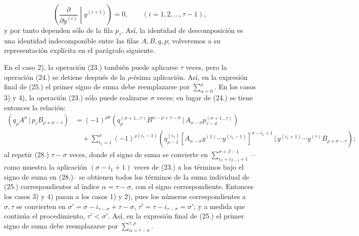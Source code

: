 \documentclass[11pt]{article}
\newcommand{\pair}[2]{(#1\,|\,#2)}
\begin{document}
\begin{equation}
 \left(\frac{\partial}{\partial y^{(i)}}\middle|y^{(i+1)}\right)=0,
 \qquad (i=1,2,\ldots,\tau-1),
\tag{27}
\end{equation}
y por tanto dependen sólo de la fila $p_\tau$. Así, la identidad de descomposición es una identidad indecomponible entre las filas $A,B,q,p$; volveremos a su representación explícita en el parágrafo siguiente.

En el caso 2), la operación (23.) también puede aplicarse $\tau$ veces, pero la operación (24.) se detiene después de la $\rho$-ésima aplicación. Así, en la expresión final de (25.) el primer signo de suma debe reemplazarse por $\sum_{\alpha=0}^{\rho}$. En los casos 3) y 4), la operación (23.) sólo puede realizarse $\sigma$ veces; en lugar de (24.) se tiene entonces la relación:
\begin{equation}
\begin{aligned}
\pair{q_\rho A^\sigma}{p_\tau B_{\rho+\sigma-\tau}}
&=(-1)^{\rho\sigma}
 \pair{q_\rho^{(\sigma+1\ldots\tau)}B^{n-\rho+\tau-\sigma}}{A_{n-\sigma}p_{\tau-\sigma}^{(\sigma+1\ldots\tau)}}\\
&\quad+\sum_{i_1=1}^{\sigma}(-1)^{\rho(i_1-1)}
 \pair{q_{\rho-1}^{(i_1)}[A_{n-\sigma}y^{(1)}\cdots y^{(i_1-1)}]^{\sigma-i_1+1}}
 {y^{(i_1+1)}\cdots y^{(\tau)}B_{\rho+\sigma-\tau}};
\end{aligned}
\tag{28}
\end{equation}
al repetir (28.) $\tau-\sigma$ veces, donde el signo de suma se convierte en $\sum_{i_\beta=i_{\beta-1}+1}^{\sigma+\beta-1}$ --como muestra la aplicación $(\sigma-i_1+1)$ veces de (23.) a los términos bajo el signo de suma en (28.)-- se obtienen todos los términos de la suma individual de (25.) correspondientes al índice $\alpha=\tau-\sigma$, con el signo correspondiente. Entonces los casos 3) y 4) pasan a los casos 1) y 2), pues los números correspondientes a $\sigma,\tau$ se convierten en $\sigma'=\sigma-i_{\tau-\sigma}+\tau-\sigma$, $\tau'=\tau-i_{\tau-\sigma}=\sigma'$; y a medida que continúa el procedimiento, $\tau'<\sigma'$. Así, en la expresión final de (25.) el primer signo de suma debe reemplazarse por $\sum_{\alpha=\tau-\sigma}^{\tau,\rho}$.
\end{document}
